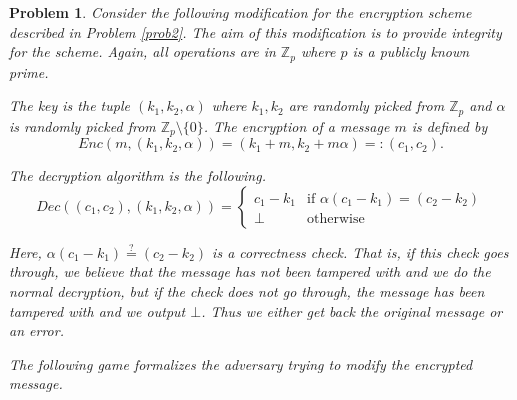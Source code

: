 \documentclass{../homework}
\newtheorem{problem}{Problem}
\begin{document}
\iffalse
\begin{problem}
    Consider the following modification for the encryption scheme described in
    Problem \ref*{prob2}. The aim of this modification is to provide integrity
    for the scheme. Again, all operations are in $\mathbb{Z}_p$ where $p$ is a
    publicly known prime.
    
    The key is the tuple $(k_1,k_2,\alpha)$ where $k_1,k_2$ are  randomly picked
    from $\mathbb{Z}_p$ and $\alpha$ is randomly picked from
    $\mathbb{Z}_p\setminus\{0\}$. The  encryption of  a message $m$ is defined
    by
    $$
        Enc(m,(k_1,k_2,\alpha))=(k_1+m,k_2+m\alpha)=:(c_1,c_2).
    $$
    
    The decryption algorithm is the following.
    $$
        Dec((c_1,c_2),(k_1,k_2,\alpha))=
        \begin{cases}
            c_1-k_1 & \text{if } \alpha(c_1-k_1)=(c_2-k_2)\\
            \bot & \text{otherwise}
        \end{cases}
    $$
    
    Here, $\alpha(c_1-k_1)\stackrel{?}{=}(c_2-k_2)$ is a correctness check. That
    is, if this check goes through, we believe that the message has not been
    tampered with and we do the normal decryption, but  if the check does not go
    through, the message has been tampered with and we output $\bot$. Thus we
    either get back the original message or an error.
    
    The following game formalizes the adversary trying to modify the encrypted
    message. 

\begin{center}
\end{center}


\end{problem}
\end{document}
